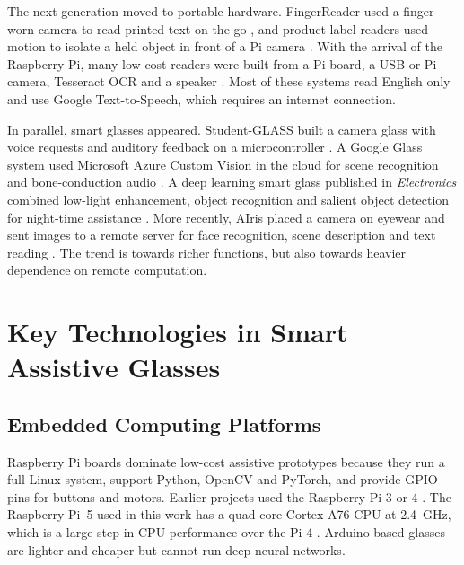 The next generation moved to portable hardware. FingerReader used a finger-worn camera to read printed text on the go \cite{fingerreader2014}, and product-label readers used motion to isolate a held object in front of a Pi camera \cite{labelreading2017}. With the arrival of the Raspberry Pi, many low-cost readers were built from a Pi board, a USB or Pi camera, Tesseract OCR and a speaker \cite{readingaid_rpi2023, visionvoice2024, cameraocr2023, itra2022, imgproc_text2019}. Most of these systems read English only and use Google Text-to-Speech, which requires an internet connection.

In parallel, smart glasses appeared. Student-GLASS built a camera glass with voice requests and auditory feedback on a microcontroller \cite{studentglass2017}. A Google Glass system used Microsoft Azure Custom Vision in the cloud for scene recognition and bone-conduction audio \cite{googleglass2021}. A deep learning smart glass published in \textit{Electronics} combined low-light enhancement, object recognition and salient object detection for night-time assistance \cite{smartglass_mdpi2021}. More recently, AIris placed a camera on eyewear and sent images to a remote server for face recognition, scene description and text reading \cite{airis2024}. The trend is towards richer functions, but also towards heavier dependence on remote computation.

\section{Key Technologies in Smart Assistive Glasses}
\label{sec:keytech}

\subsection{Embedded Computing Platforms}
Raspberry Pi boards dominate low-cost assistive prototypes because they run a full Linux system, support Python, OpenCV and PyTorch, and provide GPIO pins for buttons and motors. Earlier projects used the Raspberry Pi 3 or 4 \cite{readingaid_rpi2023, visionvoice2024, aiblind2025, voicereading2025}. The Raspberry Pi~5 used in this work has a quad-core Cortex-A76 CPU at 2.4~GHz, which is a large step in CPU performance over the Pi 4 \cite{raspberrypi5}. Arduino-based glasses \cite{lightweight_glass2025} are lighter and cheaper but cannot run deep neural networks.

